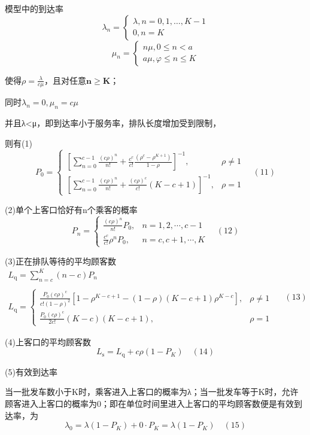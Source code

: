 \documentclass[withoutpreface,bwprint]{cumcmthesis} %
\begin{document}
模型中的到达率
$$
\lambda_{n}=\left\{\begin{array}{c}{\lambda, n=0,1, \ldots, K-1} \\ {0, n=K}\end{array}\right.
$$
$$
\mu_{n}=\left\{\begin{array}{l}{n \mu, 0 \leq n<a} \\ {a \mu, \varphi \leq n \leq K}\end{array}\right.
$$

使得$\rho=\frac{\lambda}{c \mu}$，且对任意$\mathbf{n} \geq \mathbf{K}$；

同时$\lambda_{n}=0, \mu_{n}=c \mu$

并且λ<μ，即到达率小于服务率，排队长度增加受到限制，

则有(1)
$$
P_{0}=\left\{\begin{array}{ll}{\left[\sum_{n=0}^{c-1} \frac{(c \rho)^{n}}{n !}+\frac{c^{c}}{c !} \frac{\left(\rho^{c}-\rho^{K+1}\right)}{1-\rho}\right]^{-1},} & {\rho \neq 1} \\ {\left[\sum_{n=0}^{c-1} \frac{(c \rho)^{n}}{n !}+\frac{(c \rho)^{c}}{c !}(K-c+1)\right]^{-1},} & {\rho=1}\end{array}\right. \quad(11)
$$

(2)单个上客口恰好有n个乘客的概率
$$
P_{n}=\left\{\begin{array}{ll}{\frac{(c \rho)^{n}}{n !} P_{0},} & {n=1,2, \cdots, c-1} \\ {\frac{c^{c}}{c !} \rho^{n} P_{0},} & {n=c, c+1, \cdots, K}\end{array}\right. \quad(12)
$$

(3)正在排队等待的平均顾客数
$$
\begin{array}{c}{L_{\mathrm{q}}=\sum_{n=c}^{K}(n-c) P_{n}} \\ \\ {L_{\mathrm{q}}=\left\{\begin{array}{ll}{\frac{P_{0}(c \rho)^{\mathrm{c}}}{c !(1-\rho)^{2}}\left[1-\rho^{K-c+1}-(1-\rho)(K-c+1) \rho^{K-c}\right],} & {\rho \neq 1} \\ {\frac{P_{0}(c \rho)^{\mathrm{c}}}{2 c !}(K-c)(K-c+1),} & {\rho=1}\end{array}\right.}\end{array} \quad(13)
$$

(4)上客口的平均顾客数
$$
L_{\mathrm{s}}=L_{\mathrm{q}}+c \rho\left(1-P_{K}\right) \quad(14)
$$

(5)有效到达率


当一批发车数小于K时，乘客进入上客口的概率为λ；当一批发车等于K时，允许顾客进入上客口的概率为0；即在单位时间里进入上客口的平均顾客数便是有效到达率，为
$$
\lambda_{0}=\lambda\left(1-P_{K}\right)+0 \cdot P_{K}=\lambda\left(1-P_{K}\right) \quad(15)
$$
\end{document}
